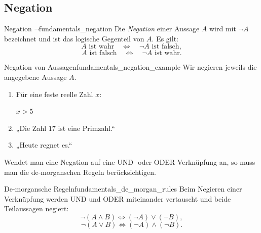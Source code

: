 \subsection{Negation}
\label{subsec:fundamentals_negation}

\begin{DefinitionBox}{Negation $\neg$}{fundamentals_negation}
  Die \emph{Negation}  einer Aussage $A$ wird mit
  $\neg A$ bezeichnet und ist das logische Gegenteil von $A$. Es gilt:
  \[
    A\text{ ist wahr}
    \quad\Longleftrightarrow\quad
    \neg A\text{ ist falsch},
  \]
  \[
    A\text{ ist falsch}
    \quad\Longleftrightarrow\quad
    \neg A\text{ ist wahr}.
  \]
\end{DefinitionBox}

\begin{ExampleBox}{Negation von Aussagen}{fundamentals_negation_example}
  Wir negieren jeweils die angegebene Aussage $A$.
  \begin{enumerate}[label=(\alph*),itemsep=0.8em]
    \item Für eine feste reelle Zahl $x$:
      \par\smallskip
      $x>5$\\[0.4em]

    \item
      \par\smallskip
      „Die Zahl $17$ ist eine Primzahl.“\\[0.4em]

    \item
      \par\smallskip
      „Heute regnet es.“\\[0.4em]
  \end{enumerate}
\end{ExampleBox}


Wendet man eine Negation auf eine UND- oder ODER-Verknüpfung an, so muss man die
de-morganschen Regeln berücksichtigen.

\begin{TheoremBox}{De-morgansche Regeln}{fundamentals_de_morgan_rules}
  Beim Negieren einer Verknüpfung werden UND und ODER miteinander vertauscht
  und beide Teilaussagen negiert:
  \[
    \neg(A\land B)\Leftrightarrow (\neg A)\lor(\neg B),
  \]
  \[
    \neg(A\lor B)\Leftrightarrow (\neg A)\land(\neg B).
  \]
\end{TheoremBox}

